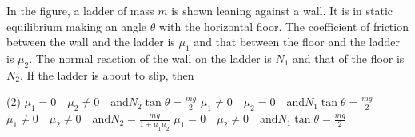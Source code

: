 
\item In the figure, a ladder of mass $m$ is shown leaning against a wall. It is in static equilibrium making an angle $\theta$ with the horizontal floor. The coefficient of friction between the wall and the ladder is $\mu_1$ and that between the floor and the ladder is $\mu_2$. The normal reaction of the wall on the ladder is $N_1$ and that of the floor is $N_2$. If the ladder is about to slip, then
    \begin{center}
    \end{center}
    \begin{tasks}(2)
        \task $\mu_1 = 0 \quad \mu_2 \neq 0\quad$and$N_2 \tan\theta = \frac{mg}{2}$
        \task $\mu_1 \neq 0 \quad \mu_2 = 0\quad$and$N_1 \tan\theta = \frac{mg}{2}$
        \task $\mu_1 \neq 0 \quad \mu_2 \neq 0\quad$and$N_2 = \frac{mg}{1+\mu_1\mu_2}$
        \task $\mu_1 = 0 \quad \mu_2 \neq 0\quad$and$N_1 \tan\theta = \frac{mg}{2}$
    \end{tasks}
